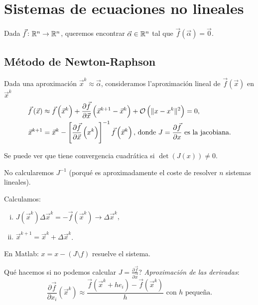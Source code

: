 \chapter{Sistemas de ecuaciones no lineales}

\noindent Dada $\vec{f} \colon \mathbb{R}^n \to \mathbb{R}^n$, queremos encontrar $\vec{\alpha} \in \mathbb{R}^n$ tal que $\vec{f}\left( \vec{\alpha} \right) = \vec{0}$.

\section{M\'etodo de Newton-Raphson}

Dada una aproximaci\'on $\vec{x}^k \approx \vec{\alpha}$, consideramos l'aproximaci\'on lineal de $\vec{f}\left( \vec{x} \right)$ en $\vec{x}^k$
\begin{align*}
    \vec{f}\left( \vec{x} \right) &\approx \vec{f}\left( \vec{x}^k \right) + \frac{\partial \vec{f}}{\partial \vec{x}}\left( \vec{x}^{k+1}-\vec{x}^k \right) + \mathcal{O} \left( \|x-x^k\|^2 \right) = 0, \\
    \vec{x}^{k+1} &= \vec{x}^k - \left[ \frac{\partial\vec{f}}{\partial\vec{x}}\left( x^k \right) \right]^{-1} \vec{f}\left( \vec{x}^k \right),\, \text{donde } J = \frac{\partial\vec{f}}{\partial x} \text{ es la jacobiana.}
\end{align*}

Se puede ver que tiene convergencia cuadr\'atica si $\det\left( J(x) \right) \neq 0$.

\begin{obs}
    No calcularemos $J^{-1}$ (porqu\'e es aproximadamente el coste de resolver $n$ sistemas lineales).
\end{obs}

\noindent Calculamos:
\begin{enumerate}[i)]
    \item $J\left( \vec{x}^k \right)\Delta \vec{x}^k = -\vec{f}\left( \vec{x}^k \right) \longrightarrow \Delta \vec{x}^k$,
    \item $\vec{x}^{k+1} = \vec{x}^k + \Delta\vec{x}^k$.
\end{enumerate}
En Matlab: $x = x-(J\setminus f)$ resuelve el sistema.

\noindent Qu\'e hacemos si no podemos calcular $J = \frac{\partial \vec{f}}{\partial \vec{x}}$?
\emph{Aproximaci\'on de las derivadas}:
\[
    \frac{\partial \vec{f}}{\partial x_i}\left( \vec{x}^k \right) \approx \frac{\vec{f}\left( \vec{x}^k + he_i \right) - \vec{f}\left( \vec{x}^k \right)}{h} \text{ con } h \text{ pequeña.}
\]

